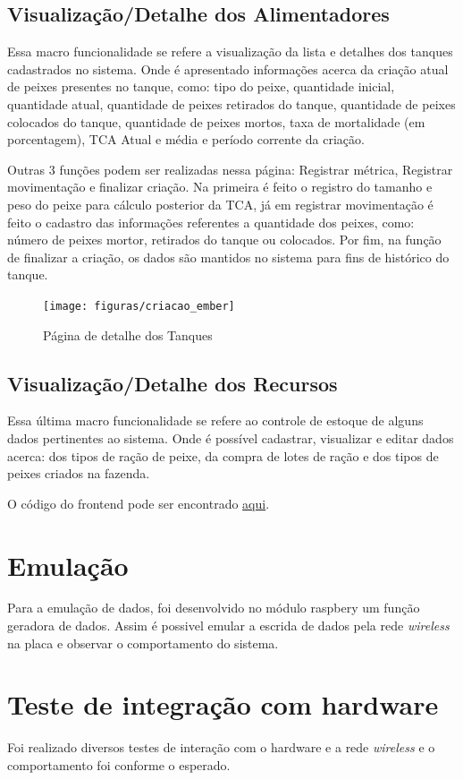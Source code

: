 \subsection{Visualização/Detalhe dos Alimentadores}

Essa macro funcionalidade se refere a visualização da lista e detalhes dos tanques cadastrados no sistema.
Onde é apresentado informações acerca da criação atual de peixes presentes no tanque, como: tipo do peixe,
quantidade inicial, quantidade atual, quantidade de peixes retirados do tanque, quantidade de peixes colocados do tanque,
quantidade de peixes mortos, taxa de mortalidade (em porcentagem), TCA Atual e média e período corrente da criação.

Outras 3 funções podem ser realizadas nessa página: Registrar métrica, Registrar movimentação e finalizar criação. Na primeira
é feito o registro do tamanho e peso do peixe para cálculo posterior da TCA, já em registrar movimentação é feito o cadastro das
informações referentes a quantidade dos peixes, como: número de peixes mortor, retirados do tanque ou colocados. Por fim, na função
de finalizar a criação, os dados são mantidos no sistema para fins de histórico do tanque.

\begin{figure}[H]
    \centering
    \texttt{[image: figuras/criacao\_ember]}
    \caption{Página de detalhe dos Tanques}
    \label{fig:criacao_ember}
\end{figure}

\subsection{Visualização/Detalhe dos Recursos}

Essa última macro funcionalidade se refere ao controle de estoque de alguns dados pertinentes ao sistema. Onde é possível
cadastrar, visualizar e editar dados acerca: dos tipos de ração de peixe, da compra de lotes de ração e dos tipos de peixes criados na fazenda.

O código do frontend pode ser encontrado \href{https://github.com/PI2-Crema/front-ember}{aqui}.

\section{Emulação}

Para a emulação de dados, foi desenvolvido no módulo raspbery um função geradora de dados. Assim é possivel emular a escrida de dados pela rede \textit{wireless} na placa e observar o comportamento do sistema.

\section{Teste de integração com hardware}

Foi realizado diversos testes de interação com o hardware e a rede \textit{wireless} e o comportamento foi conforme o esperado.
